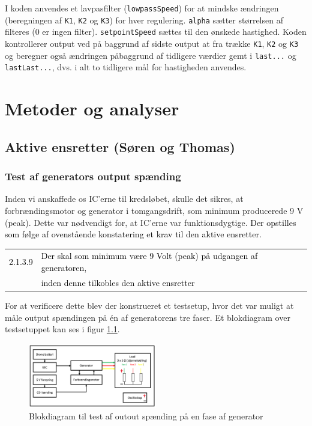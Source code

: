 I koden anvendes et lavpasfilter (\lstinline{lowpassSpeed}) for at mindske ændringen (beregningen af \lstinline{K1}, \lstinline{K2} og \lstinline{K3}) for hver regulering. \lstinline{alpha} sætter størrelsen af filteres (0 er ingen filter). \lstinline{setpointSpeed} sættes til den ønskede hastighed. Koden kontrollerer output ved på baggrund af sidste output at fra trække \lstinline{K1}, \lstinline{K2} og \lstinline{K3} og beregner også ændringen påbaggrund af tidligere værdier gemt i \lstinline{last...} og \lstinline{lastLast...}, dvs. i alt to tidligere mål for hastigheden anvendes.


\chapter[Metoder]{Metoder og analyser}
\label{sec:metode}

\section{Aktive ensretter (Søren og Thomas)}
\label{sec:aktive-ensr-soren}

\subsection{Test af generators output spænding}
\label{sec:test-af-generators}

Inden vi anskaffede os IC’erne til kredsløbet, skulle det sikres, at forbrændingsmotor og generator i tomgangsdrift, som minimum producerede 9 V (peak). Dette var nødvendigt for, at IC’erne var funktionsdygtige. \textcolor{black}{Der opstilles som følge af ovenstående konstatering et krav til den aktive ensretter.}

\begin{tabular}{p{1cm}l}
  \textcolor{black}{2.1.3.9}&\textcolor{black}{Der skal som minimum være 9 Volt (peak) på udgangen af generatoren,}\\
  & \textcolor{black}{inden denne tilkobles den aktive ensretter}
\end{tabular}

For at verificere dette blev der konstrueret et testsetup, hvor det var muligt at måle output spændingen på én af generatorens tre faser. Et blokdiagram over testsetuppet kan ses i figur \ref{fig:prens5}.

\begin{figure}[h]
  \centering
  \includegraphics[width=0.5\textwidth]{./figurer/prens5.png}
  \caption{Blokdiagram til test af outout spænding på en fase af generator}
  \label{fig:prens5}
\end{figure}

